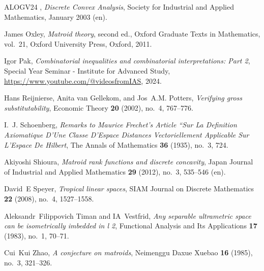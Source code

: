 \documentclass{amsart}
\theoremstyle{definition}
\theoremstyle{remark}
\newcommand{\1}{\mathbf{1}}
\numberwithin{equation}{section}
\begin{document}
\begin{thebibliography}{ALOGV24}
\bysame, \emph{Discrete {Convex} {Analysis}}, Society for Industrial and
  Applied Mathematics, January 2003 (en).

James Oxley, \emph{Matroid theory}, second ed., Oxford Graduate Texts in
  Mathematics, vol.~21, Oxford University Press, Oxford, 2011. 

Igor Pak, \emph{Combinatorial inequalities and combinatorial interpretations:
  Part 2}, Special Year Seminar - Institute for Advanced Study,
  \url{https://www.youtube.com/@videosfromIAS}, 2024.

Hans Reijnierse, Anita van Gellekom, and Jos~A.M. Potters, \emph{Verifying
  gross substitutability}, Economic Theory \textbf{20} (2002), no.~4, 767--776.

I.~J. Schoenberg, \emph{Remarks to {Maurice} {Frechet}'s {Article} ``{Sur} {La}
  {Definition} {Axiomatique} {D}'{Une} {Classe} {D}'{Espace} {Distances}
  {Vectoriellement} {Applicable} {Sur} {L}'{Espace} {De} {Hilbert}}, The Annals
  of Mathematics \textbf{36} (1935), no.~3, 724.

Akiyoshi Shioura, \emph{Matroid rank functions and discrete concavity}, Japan
  Journal of Industrial and Applied Mathematics \textbf{29} (2012), no.~3,
  535--546 (en).

David~E Speyer, \emph{Tropical linear spaces}, SIAM Journal on Discrete
  Mathematics \textbf{22} (2008), no.~4, 1527--1558.

Aleksandr~Filippovich Timan and IA~Vestfrid, \emph{Any separable ultrametric
  space can be isometrically imbedded in l 2}, Functional Analysis and Its
  Applications \textbf{17} (1983), no.~1, 70--71.

Cui~Kui Zhao, \emph{A conjecture on matroids}, Neimenggu Daxue Xuebao
  \textbf{16} (1985), no.~3, 321--326. 

\end{thebibliography}
\end{document}
